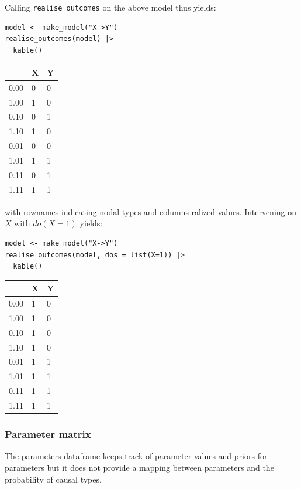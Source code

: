 \documentclass[
  article]{jss}
\begin{document}
Calling \texttt{realise\_outcomes} on the above model thus yields:

\begin{verbatim}
model <- make_model("X->Y") 
realise_outcomes(model) |>
  kable()
\end{verbatim}

\begin{longtable}[]{@{}lll@{}}
\toprule()
& X & Y \\
\midrule()
\endhead
0.00 & 0 & 0 \\
1.00 & 1 & 0 \\
0.10 & 0 & 1 \\
1.10 & 1 & 0 \\
0.01 & 0 & 0 \\
1.01 & 1 & 1 \\
0.11 & 0 & 1 \\
1.11 & 1 & 1 \\
\bottomrule()
\end{longtable}

with rownames indicating nodal types and columns ralized values.
Intervening on \(X\) with \(do(X=1)\) yields:

\begin{verbatim}
model <- make_model("X->Y") 
realise_outcomes(model, dos = list(X=1)) |>
  kable()
\end{verbatim}

\begin{longtable}[]{@{}lll@{}}
\toprule()
& X & Y \\
\midrule()
\endhead
0.00 & 1 & 0 \\
1.00 & 1 & 0 \\
0.10 & 1 & 0 \\
1.10 & 1 & 0 \\
0.01 & 1 & 1 \\
1.01 & 1 & 1 \\
0.11 & 1 & 1 \\
1.11 & 1 & 1 \\
\bottomrule()
\end{longtable}

\hypertarget{parameter-matrix}{%
\subsubsection{Parameter matrix}\label{parameter-matrix}}

The parameters dataframe keeps track of parameter values and priors for
parameters but it does not provide a mapping between parameters and the
probability of causal types.
\end{document}
